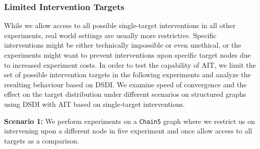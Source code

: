 \documentclass[nohyperref]{article}
\theoremstyle{plain}
\theoremstyle{definition}
\theoremstyle{remark}
\begin{document}
\subsubsection{Limited Intervention Targets}
While we allow access to all possible single-target interventions in all other experiments, real world settings are usually more restrictive. Specific interventions might be either technically impossible or even unethical, or the experiments might want to prevent interventions upon specific target nodes due to increased experiment costs. In order to test the capability of AIT, we limit the set of possible intervention targets in the following experiments and analyze the resulting behaviour based on DSDI. We examine speed of convergence and the effect on the target distribution under different scenarios on structured graphs using DSDI with AIT based on single-target interventions. 

\textbf{Scenario 1:} We perform experiments on a \texttt{Chain5} graph where we restrict us on intervening upon a different node in five experiment and once allow access to all targets as a comparison.
\end{document}
